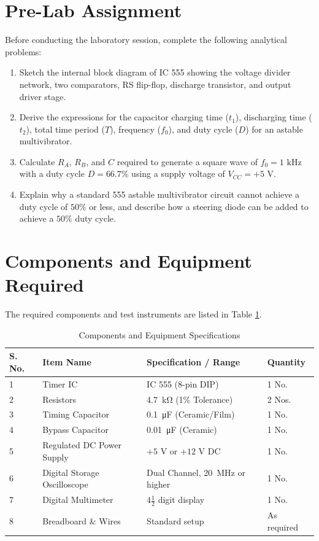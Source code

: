\section{Pre-Lab Assignment}
Before conducting the laboratory session, complete the following analytical problems:
\begin{enumerate}
	\item Sketch the internal block diagram of IC 555 showing the voltage divider network, two comparators, RS flip-flop, discharge transistor, and output driver stage.
\item Derive the expressions for the capacitor charging time ($t_1$), discharging time ($t_2$), total time period ($T$), frequency ($f_0$), and duty cycle ($D$) for an astable multivibrator.
\item Calculate $R_A$, $R_B$, and $C$ required to generate a square wave of $f_0 = 1\text{ kHz}$ with a duty cycle $D = 66.7\%$ using a supply voltage of $V_{CC} = +5\text{ V}$.
\item Explain why a standard 555 astable multivibrator circuit cannot achieve a duty cycle of $50\%$ or less, and describe how a steering diode can be added to achieve a $50\%$ duty cycle.
\end{enumerate}

\section{Components and Equipment Required}
The required components and test instruments are listed in Table \ref{tab:components_astable555}.

\begin{table}[h!]
\centering
\caption{Components and Equipment Specifications}
\label{tab:components_astable555}
\begin{tabular}{llll}
	\toprule
	\textbf{S. No.} & \textbf{Item Name} & \textbf{Specification / Range} & \textbf{Quantity} \\
	\midrule
	1 & Timer IC & IC 555 (8-pin DIP) & 1 No. \\
	2 & Resistors & \SI{4.7}{\kilo\ohm} (1\% Tolerance) & 2 Nos. \\
	3 & Timing Capacitor & \SI{0.1}{\micro\farad} (Ceramic/Film) & 1 No. \\
	4 & Bypass Capacitor & \SI{0.01}{\micro\farad} (Ceramic) & 1 No. \\
	5 & Regulated DC Power Supply & $+5\text{ V}$ or $+12\text{ V}$ DC & 1 No. \\
	6 & Digital Storage Oscilloscope & Dual Channel, \SI{20}{\mega\hertz} or higher & 1 No. \\
	7 & Digital Multimeter & $4\frac{1}{2}$ digit display & 1 No. \\
	8 & Breadboard \& Wires & Standard setup & As required \\
	\bottomrule
\end{tabular}
\end{table}

